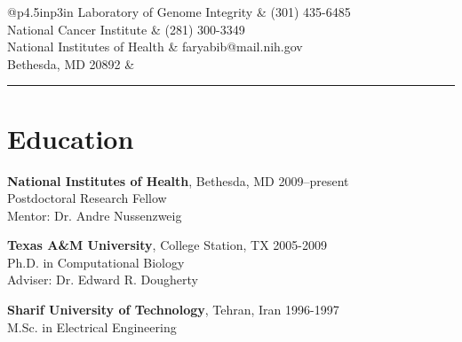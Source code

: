 \documentclass[12pt, centered, centered]{res_yy}
\newenvironment{list1}{
  \begin{list}{\ding{113}}{%
      \setlength{\itemsep}{0in}
      \setlength{\parsep}{0in} \setlength{\parskip}{0in}
      \setlength{\topsep}{0in} \setlength{\partopsep}{0in} 
      \setlength{\leftmargin}{0.17in}}}{\end{list}}
\begin{document}

\begin{resume}
\vspace{.05in}
\begin{tabular}{@{}p{4.5in}p{3in}}
Laboratory of Genome Integrity			& \hspace{-0.4in}{\it Office:}  (301) 435-6485\\
National Cancer Institute                                 & \hspace{-0.4in}{\it Cell:}    (281) 300-3349 \\            
National Institutes of Health    			& \hspace{-0.4in}{\it E-mail:}  faryabib@mail.nih.gov\\         
Bethesda, MD 20892		& \\   %
\end{tabular}

\vspace{-.1in}
\rule{\linewidth}{0.05mm}
\section{\sc  Education}
\vspace{0.2in}
\begin{list1}

\item[] {\bf National Institutes of Health}, Bethesda, MD \hfill 2009--present\\
Postdoctoral Research Fellow\\
Mentor: Dr.  Andre Nussenzweig
\vspace{.1in}

\item[] {\bf Texas A\&M University}, College Station, TX \hfill 2005-2009\\
Ph.D. in Computational Biology\\
Adviser: Dr. Edward R. Dougherty
\vspace{.1in}

\item[] {\bf Sharif University of Technology}, Tehran, Iran \hfill 1996-1997\\
M.Sc. in Electrical Engineering
\vspace{.1in}


\end{list1}
\end{resume}
\end{document}
